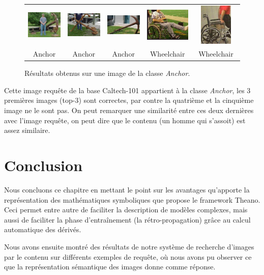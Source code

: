 \begin{figure}[H]
\begin{tabular}{ccccc}
\includegraphics[width=3cm]{Figures/anchor/1.jpg}
&
\includegraphics[width=3cm]{Figures/anchor/2.jpg}
&
\includegraphics[width=3cm]{Figures/anchor/3.jpg}
&
\includegraphics[width=3cm]{Figures/anchor/4.jpg}
&
\includegraphics[height=2cm,width=3cm]{Figures/anchor/5.jpg}\\
Anchor & Anchor & Anchor & Wheelchair & Wheelchair\\

\end{tabular}
\caption[comp7]{Résultats obtenus sur une image de la classe \textit{Anchor}.}
\end{figure}

	Cette image requête de la base Caltech-101 appartient à la classe \textit{Anchor}, les 3 premières images (top-3) sont correctes, par contre la quatrième et la cinquième image ne le sont pas. On peut remarquer une similarité entre ces deux dernières avec l'image requête, on peut dire que le contenu (un homme qui s'assoit) est assez similaire.

\section{Conclusion}

	Nous concluons ce chapitre en mettant le point sur les avantages qu'apporte la représentation des mathématiques symboliques que propose le framework Theano. Ceci permet entre autre de faciliter la description de modèles complexes, mais aussi de faciliter la phase d'entraînement (la rétro-propagation) grâce au calcul automatique des dérivés.
	
	Nous avons ensuite montré des résultats de notre système de recherche d'images par le contenu sur différents exemples de requête, où nous avons pu observer ce que la représentation sémantique des images donne comme réponse.
	
	